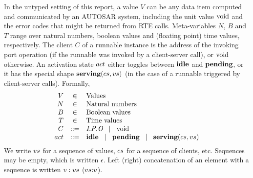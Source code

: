 \documentclass[twocolumn]{article}
\begin{document}
In the untyped setting of this report, a value $V$ can be any data item computed and communicated by an AUTOSAR system, including the unit value $\text{void}$ and the error codes that might be returned from RTE calls. Meta-variables $N$, $B$ and $T$ range over natural numbers, boolean values and (floating point) time values, respectively. The client $C$ of a runnable instance is the address of the invoking port operation (if the runnable was invoked by a client-server call), or $\text{void}$ otherwise. An activation state $\Act$ either toggles between $\textbf{idle}$ and $\textbf{pending}$, or it has the special shape $\Tserving{\Cs}{\Vs}$ (in the case of a runnable triggered by client-server calls). Formally,
\[
\begin{array}{rcll}
	V	& \in		& \text{Values} \\
	N	& \in		& \text{Natural numbers} \\
	B	& \in		& \text{Boolean values} \\
	T	& \in		& \text{Time values} \\
	C	& ::=		& \Top{O}{P}{I} \sep \Tvoid \\
	\Act	& ::=		& \Tidle \sep \Tpending \sep \Tserving{\Cs}{\Vs} \\
\end{array}
\]
We write $\Vs$ for a sequence of values, $\Cs$ for a sequence of clients, etc. Sequences may be empty, which is written $\epsilon$. Left (right) concatenation of an element with a sequence is written $\Tcons{\V{V}}{\V{Vs}}$ ($\Tsnoc{\V{Vs}}{\V{V}}$).
\end{document}
